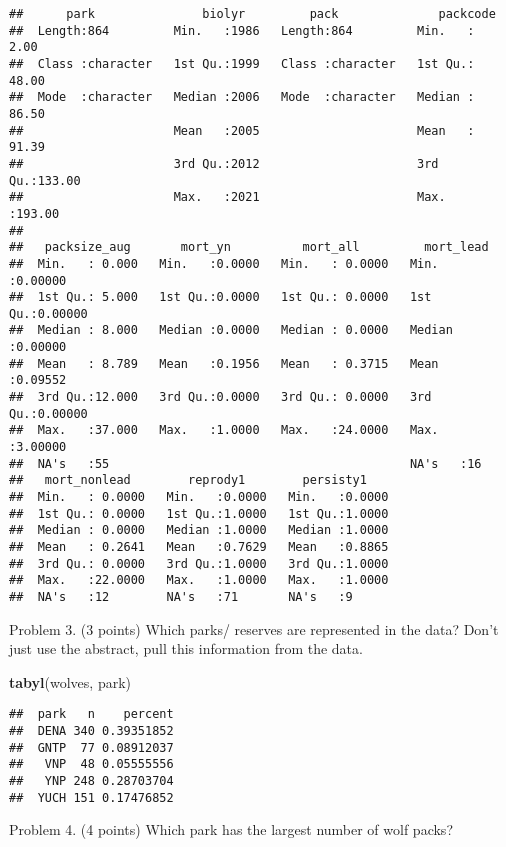 \documentclass[
]{article}
\newenvironment{Shaded}{\begin{snugshade}}{\end{snugshade}}
\newcommand{\FunctionTok}[1]{\textcolor[rgb]{0.13,0.29,0.53}{\textbf{#1}}}
\newcommand{\NormalTok}[1]{#1}
\begin{document}
\begin{verbatim}
##      park               biolyr         pack              packcode     
##  Length:864         Min.   :1986   Length:864         Min.   :  2.00  
##  Class :character   1st Qu.:1999   Class :character   1st Qu.: 48.00  
##  Mode  :character   Median :2006   Mode  :character   Median : 86.50  
##                     Mean   :2005                      Mean   : 91.39  
##                     3rd Qu.:2012                      3rd Qu.:133.00  
##                     Max.   :2021                      Max.   :193.00  
##                                                                       
##   packsize_aug       mort_yn          mort_all         mort_lead      
##  Min.   : 0.000   Min.   :0.0000   Min.   : 0.0000   Min.   :0.00000  
##  1st Qu.: 5.000   1st Qu.:0.0000   1st Qu.: 0.0000   1st Qu.:0.00000  
##  Median : 8.000   Median :0.0000   Median : 0.0000   Median :0.00000  
##  Mean   : 8.789   Mean   :0.1956   Mean   : 0.3715   Mean   :0.09552  
##  3rd Qu.:12.000   3rd Qu.:0.0000   3rd Qu.: 0.0000   3rd Qu.:0.00000  
##  Max.   :37.000   Max.   :1.0000   Max.   :24.0000   Max.   :3.00000  
##  NA's   :55                                          NA's   :16       
##   mort_nonlead        reprody1        persisty1     
##  Min.   : 0.0000   Min.   :0.0000   Min.   :0.0000  
##  1st Qu.: 0.0000   1st Qu.:1.0000   1st Qu.:1.0000  
##  Median : 0.0000   Median :1.0000   Median :1.0000  
##  Mean   : 0.2641   Mean   :0.7629   Mean   :0.8865  
##  3rd Qu.: 0.0000   3rd Qu.:1.0000   3rd Qu.:1.0000  
##  Max.   :22.0000   Max.   :1.0000   Max.   :1.0000  
##  NA's   :12        NA's   :71       NA's   :9
\end{verbatim}

Problem 3. (3 points) Which parks/ reserves are represented in the data?
Don't just use the abstract, pull this information from the data.

\begin{Shaded}
\begin{Highlighting}[]
\FunctionTok{tabyl}\NormalTok{(wolves, park)}
\end{Highlighting}
\end{Shaded}

\begin{verbatim}
##  park   n    percent
##  DENA 340 0.39351852
##  GNTP  77 0.08912037
##   VNP  48 0.05555556
##   YNP 248 0.28703704
##  YUCH 151 0.17476852
\end{verbatim}

Problem 4. (4 points) Which park has the largest number of wolf packs?
\end{document}
